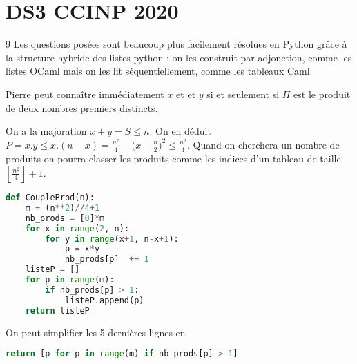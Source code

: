 \chapter{DS3 CCINP 2020}
\setcounter{Exercise}9
Les questions posées sont beaucoup plus facilement résolues en Python grâce à la structure hybride des listes python : on les construit par adjonction, comme les listes OCaml mais on les lit séquentiellement, comme les tableaux Caml.
\begin{Exercise}
Pierre peut connaître immédiatement $x$ et et $y$ si et seulement si $\Pi$ est le produit de deux nombres premiers distincts.
\end{Exercise}
On a la majoration $x+y = S\le n$. On en déduit $P = x.y \le x.(n-x)=\frac{n^2}4 - \bigl(x-\frac n2\bigr)^2\le \frac{n^2}4$. Quand on cherchera un nombre de produits on pourra classer les produits comme les indices d'un tableau de taille $\left\lfloor\frac{n^2}4\right\rfloor+1$.
\begin{Exercise}
\begin{lstlisting}[language=python]
def CoupleProd(n):
    m = (n**2)//4+1
    nb_prods = [0]*m
    for x in range(2, n):
        for y in range(x+1, n-x+1):
            p = x*y
            nb_prods[p]  += 1
    listeP = []
    for p in range(m):
        if nb_prods[p] > 1:
            listeP.append(p)
    return listeP
\end{lstlisting}

On peut simplifier les 5 dernières lignes en 
\begin{lstlisting}[language=python]
    return [p for p in range(m) if nb_prods[p] > 1]
\end{lstlisting}
\end{Exercise}
